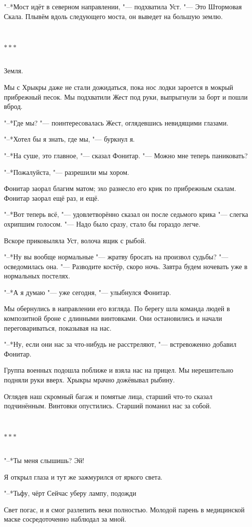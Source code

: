 \documentclass[a4paper,12pt,fleqn]{book}
\newcommand{\ldotst}{\so{...}\xspace}
\newcommand{\razd}{~\\{\centering\Large\bfseries$\ast \ast \ast$\par}~\\}
\begin{document}
"--*Мост идёт в северном направлении, "--- подхватила Уст.
"--- Это Штормовая Скала.
Плывём вдоль следующего моста, он выведет на большую землю.

\razd

Земля.

Мы с Хрыкры даже не стали дожидаться, пока нос лодки зароется в мокрый прибрежный песок.
Мы подхватили Жест под руки, выпрыгнули за борт и пошли вброд.

"--*Где мы? "--- поинтересовалась Жест, оглядевшись невидящими глазами.

"--*Хотел бы я знать, где мы, "--- буркнул я.

"--*На суше, это главное, "--- сказал Фонитар.
"--- Можно мне теперь паниковать?

"--*Пожалуйста, "--- разрешили мы хором.

Фонитар заорал благим матом;
эхо разнесло его крик по прибрежным скалам.
Фонитар заорал ещё раз, и ещё.

"--*Вот теперь всё, "--- удовлетворённо сказал он после седьмого крика "--- слегка охрипшим голосом.
"--- Надо было сразу, стало бы гораздо легче.

Вскоре приковыляла Уст, волоча ящик с рыбой.

"--*Ну вы вообще нормальные "--- жратву бросать на произвол судьбы? "--- осведомилась она.
"--- Разводите костёр, скоро ночь.
Завтра будем ночевать уже в нормальных постелях.

"--*А я думаю "--- уже сегодня, "--- улыбнулся Фонитар.

Мы обернулись в направлении его взгляда.
По берегу шла команда людей в композитной броне с длинными винтовками.
Они остановились и начали переговариваться, показывая на нас.

"--*Ну, если они нас за что-нибудь не расстреляют, "--- встревоженно добавил Фонитар.

Группа военных подошла поближе и взяла нас на прицел.
Мы нерешительно подняли руки вверх.
Хрыкры мрачно дожёвывал рыбину.

Оглядев наш скромный багаж и помятые лица, старший что-то сказал подчинённым.
Винтовки опустились.
Старший поманил нас за собой.

\razd

"--*Ты меня слышишь?
Эй!

Я открыл глаза и тут же зажмурился от яркого света.

"--*Тьфу, чёрт\ldotst
Сейчас уберу лампу, подожди\ldotst

Свет погас, и я смог разлепить веки полностью.
Молодой парень в медицинской маске сосредоточенно наблюдал за мной.
\end{document}
